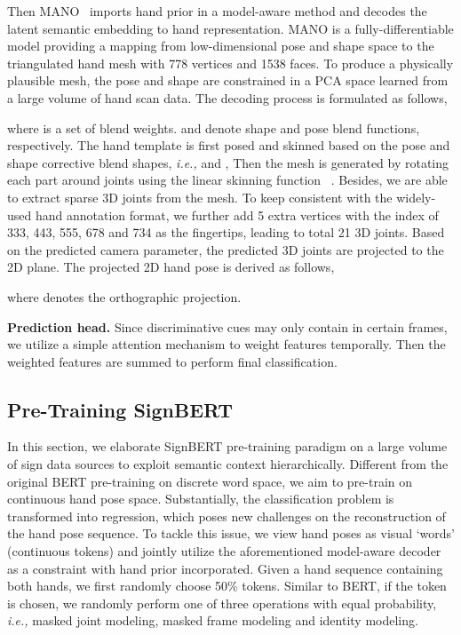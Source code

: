 \documentclass[10pt,twocolumn,letterpaper]{article}
\begin{document}
Then MANO~\cite{romero2017embodied} imports hand prior in a model-aware method and decodes the latent semantic embedding to hand representation.
MANO is a fully-differentiable model providing a mapping from low-dimensional pose  and shape  space to the triangulated hand mesh  with 778 vertices and 1538 faces.
To produce a physically plausible mesh, the pose and shape are constrained in a PCA space learned from a large volume of hand scan data.
The decoding process is formulated as follows,


where  is a set of blend weights. 
 and  denote shape and pose blend functions, respectively. 
The hand template  is first posed and skinned based on the pose and shape corrective blend shapes, \emph{i.e.,}  and ,
Then the mesh is generated by rotating each part around joints  using the linear skinning function ~\cite{kavan2005spherical}.
Besides, we are able to extract sparse 3D joints  from the mesh.
To keep consistent with the widely-used hand annotation format, we further add 5 extra vertices with the index of 333, 443, 555, 678 and 734 as the fingertips, leading to total 21 3D joints.
Based on the predicted camera parameter, the predicted 3D joints are projected to the 2D plane.
The projected 2D hand pose is derived as follows,
 
where  denotes the orthographic projection.

\noindent \textbf{Prediction head.}
Since discriminative cues may only contain in certain frames, we utilize a simple attention mechanism to weight features temporally.
Then the weighted features are summed to perform final classification.



\subsection{Pre-Training SignBERT}
In this section, we elaborate SignBERT pre-training paradigm on a large volume of sign data sources to exploit semantic context hierarchically.
Different from the original BERT pre-training on discrete word space, we aim to pre-train on continuous hand pose space.
Substantially, the classification problem is transformed into regression, which poses new challenges on the reconstruction of the hand pose sequence.
To tackle this issue, we view hand poses as visual `words' (continuous tokens) and jointly utilize the aforementioned model-aware decoder as a constraint with hand prior incorporated.
Given a hand sequence containing both hands, we first randomly choose 50\% tokens.
Similar to BERT, if the token is chosen, we randomly perform one of three operations with equal probability, \emph{i.e.,} masked joint modeling, masked frame modeling and identity modeling.
\end{document}
